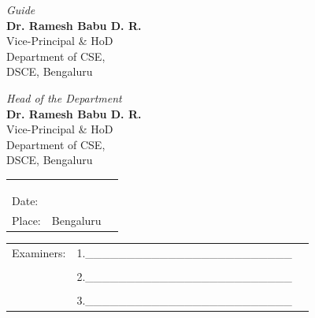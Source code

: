 \vfill

\begin{minipage}[t]{0.4\textwidth}
\emph{Guide}\\
\textbf{Dr. Ramesh Babu D. R.}\\
Vice-Principal \& HoD\\
Department of CSE,\\
DSCE, Bengaluru\\
\end{minipage}
\hspace{2cm}
\begin{minipage}[t]{0.4\textwidth}
{\emph{Head of the Department}}\\
\textbf{Dr. Ramesh Babu D. R.}\\
Vice-Principal \& HoD\\
Department of CSE,\\
DSCE, Bengaluru\\
\end{minipage}

\vfill

\begin{minipage}[t]{0.4\textwidth}
\begin{tabular}{lcc}
 &  & \tabularnewline
 &  & \tabularnewline
 &  & \tabularnewline
Date: & \tabularnewline
Place: & Bengaluru\tabularnewline
\end{tabular}
\end{minipage}\hspace{2cm}
\begin{minipage}[t]{0.4\textwidth}
\noindent
\begin{tabular}{ccr}
Examiners:& 1.\_\_\_\_\_\_\_\_\_\_\_\_\_\_\_\_\_\_\_\_\_\_\_\_\_\\
& \\
& 2.\_\_\_\_\_\_\_\_\_\_\_\_\_\_\_\_\_\_\_\_\_\_\_\_\_\\
& \\
& 3.\_\_\_\_\_\_\_\_\_\_\_\_\_\_\_\_\_\_\_\_\_\_\_\_\_\\
\end{tabular}
\end{minipage}
